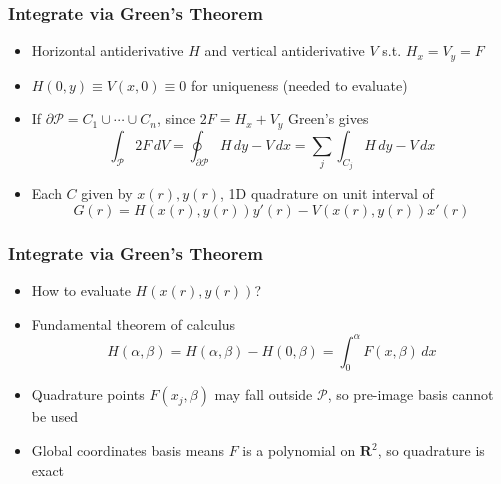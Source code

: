 \documentclass{beamer}
\begin{document}
\begin{frame}
\frametitle{Integrate via Green's Theorem}
\begin{itemize}
\item Horizontal antiderivative \(H\) and vertical antiderivative \(V\) s.t.
  \(H_x = V_y = F\)
\pause
\item \(H(0, y) \equiv V(x, 0) \equiv 0\) for uniqueness (needed
  to evaluate)
\pause
\item If \(\partial\mathcal{P} = C_1 \cup \cdots \cup C_n\),
  since \(2F = H_x + V_y\) Green's gives
\begin{equation*}
\int_{\mathcal{P}} 2 F \, dV =
\oint_{\partial \mathcal{P}} H \, dy - V \, dx =
\sum_j \int_{C_j} H \, dy - V \, dx
\end{equation*}
\pause
\vspace*{-0.6cm}
\item Each \(C\) given by \(x(r), y(r)\),
  1D quadrature on unit interval of
\begin{equation*}
G(r) = H(x(r), y(r)) y'(r) - V(x(r), y(r)) x'(r)
\end{equation*}
\end{itemize}
\end{frame}

\begin{frame}
\frametitle{Integrate via Green's Theorem}
\begin{itemize}
\item How to evaluate \(H(x(r), y(r))\)?
\pause
\item Fundamental theorem of calculus
\begin{equation*}
H\left(\alpha, \beta\right) =
  H\left(\alpha, \beta\right) - H\left(0, \beta\right) =
  \int_0^{\alpha} F\left(x, \beta\right) \, dx
\end{equation*}
\pause
\vspace*{-0.6cm}
\item Quadrature points \(F\left(x_j, \beta\right)\) may fall outside
  \(\mathcal{P}\), so pre-image basis cannot be used
\pause
\item Global coordinates basis means \(F\) is a polynomial on
  \(\mathbf{R}^2\), so quadrature is exact
\end{itemize}
\end{frame}
\end{document}

